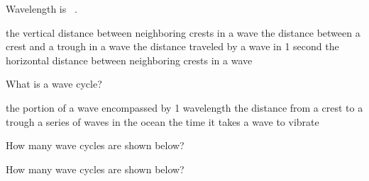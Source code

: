 \documentclass[addpoints]{exam}
\begin{document}
\begin{questions}


\question
Wavelength is \fillin\ .

\begin{choices}
    \choice the vertical distance between neighboring crests in a wave
    \choice the distance between a crest and a trough in a wave
    \choice the distance traveled by a wave in 1 second 
    \correctchoice the horizontal distance between neighboring crests in a wave
\end{choices}

\question
What is a wave cycle?

\begin{choices}
    \correctchoice the portion of a wave encompassed by 1 wavelength
    \choice the distance from a crest to a trough
    \choice a series of waves in the ocean
    \choice the time it takes a wave to vibrate
\end{choices}

\question
How many wave cycles are shown below?

\begin{figure}[h!]
    \centering
\end{figure}

\begin{oneparchoices}
\end{oneparchoices}

\question
How many wave cycles are shown below?
\begin{figure}[h!]
    \centering
\end{figure}


\end{questions}
\end{document}
